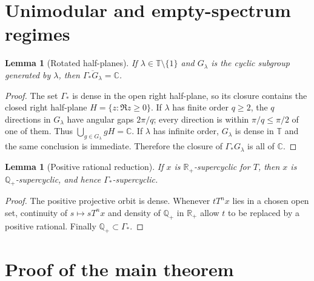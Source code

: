 \documentclass[11pt]{article}
\newtheorem{lemma}[theorem]{Lemma}
\theoremstyle{definition}
\newcommand{\C}{\mathbb C}
\newcommand{\Q}{\mathbb Q}
\newcommand{\T}{\mathbb T}
\newcommand{\Gamstar}{\Gamma_{\!*}}
\begin{document}
\section{Unimodular and empty-spectrum regimes}

\begin{lemma}[Rotated half-planes]\label{lem:halfplanes}
If $\lambda\in\T\setminus\{1\}$ and $G_\lambda$ is the cyclic subgroup
generated by $\lambda$, then $\overline{\Gamstar G_\lambda}=\C$.
\end{lemma}

\begin{proof}
The set $\Gamstar$ is dense in the open right half-plane, so its closure
contains the closed right half-plane $H=\{z:\Re z\geq0\}$.  If $\lambda$
has finite order $q\geq2$, the $q$ directions in $G_\lambda$ have angular
gaps $2\pi/q$; every direction is within $\pi/q\leq\pi/2$ of one of them.
Thus $\bigcup_{g\in G_\lambda}gH=\C$.  If $\lambda$ has infinite order,
$G_\lambda$ is dense in $\T$ and the same conclusion is immediate.
Therefore the closure of $\Gamstar G_\lambda$ is all of $\C$.
\end{proof}

\begin{lemma}[Positive rational reduction]\label{lem:rational}
If $x$ is $\mathbb R_+$-supercyclic for $T$, then $x$ is
$\Q_+$-supercyclic, and hence $\Gamstar$-supercyclic.
\end{lemma}

\begin{proof}
The positive projective orbit is dense.  Whenever $tT^nx$ lies in a chosen
open set, continuity of $s\mapsto sT^nx$ and density of $\Q_+$ in
$\mathbb R_+$ allow $t$ to be replaced by a positive rational.  Finally
$\Q_+\subset\Gamstar$.
\end{proof}

\section{Proof of the main theorem}
\end{document}
